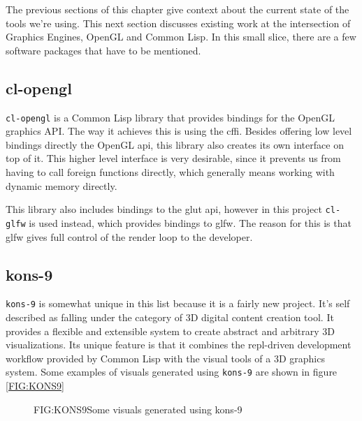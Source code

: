 
\label{SEC:SOTA}

The previous sections of this chapter give context about the current state of the tools we're using.
This next section discusses existing work at the intersection of Graphics Engines, OpenGL and Common Lisp.
In this small slice,
there are a few software packages that have to be mentioned.

\subsection{cl-opengl}

\texttt{cl-opengl} is a Common Lisp library that provides bindings for the OpenGL graphics API.
The way it achieves this is using the \ac{cffi}.
Besides offering low level bindings directly the OpenGL \ac{api},
this library also creates its own interface on top of it.
This higher level interface is very desirable,
since it prevents us from having to call foreign functions directly,
which generally means working with dynamic memory directly\cite{cffi}.

This library also includes bindings to the \ac{glut} \ac{api},
however in this project \texttt{cl-glfw} is used instead,
which provides bindings to \ac{glfw}.
The reason for this is that \ac{glfw} gives full control of the render loop to the developer.

\subsection{kons-9}

\texttt{kons-9} is somewhat unique in this list because it is a fairly new project.
It's self described as falling under the category of 3D digital content creation tool.
It provides a flexible and extensible system to create abstract and arbitrary 3D visualizations.
Its unique feature is that it combines the \ac{repl}-driven development workflow provided by Common Lisp with the visual tools of a 3D graphics system\cite{kons9}.
Some examples of visuals generated using \texttt{kons-9} are shown in figure \ref{FIG:KONS9}

\begin{figure}[Kons-9 example]{FIG:KONS9}{Some visuals generated using kons-9}
\end{figure}

